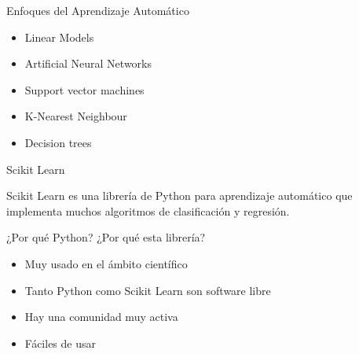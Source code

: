 \documentclass[10pt]{beamer}
\begin{document}
\begin{frame}{Enfoques del Aprendizaje Automático}


  \begin{itemize}[<+->]
  \item Linear Models
  \item Artificial Neural Networks
  \item Support vector machines
  \item K-Nearest Neighbour
  \item Decision trees
  \end{itemize}

\end{frame}

\begin{frame}{Scikit Learn}

  Scikit Learn es una librería de Python para aprendizaje automático que
  implementa muchos algoritmos de clasificación y regresión.

  ¿Por qué Python? ¿Por qué esta librería?

  \begin{itemize}[<+->]
  \item Muy usado en el ámbito científico
  \item Tanto Python como Scikit Learn son software libre
  \item Hay una comunidad muy activa
  \item Fáciles de usar
  \end{itemize}


\end{frame}

\end{document}
